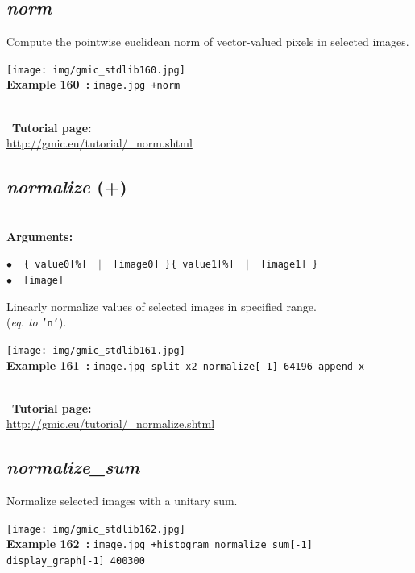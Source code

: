\documentclass[a4paper,10.5pt,twoside]{book}
\def\comma{\discretionary{,}{}{,}}
\newcommand{\Cb}[1]{\textcolor{cb}{#1}}
\begin{document}
\subsection{\emph{norm} }\vspace*{-0.7em}
Compute the pointwise euclidean norm of vector-valued pixels in selected images.
\begin{center}\texttt{[image: img/gmic\_stdlib160.jpg]}\\
{\footnotesize \textbf{Example 160~:} \texttt{image.jpg +norm}}
\end{center}
~\\
~\textbf{Tutorial page: }\\\url{http://gmic.eu/tutorial/\_norm.shtml}


\subsection{\emph{normalize} (+)}\vspace*{-0.7em}
~\\\textbf{\Cb{Arguments: }}\begin{flushleft}
{\small \Cb{\hspace*{0.5cm}$\bullet$~~\texttt{\{ value0[\%] ~$|$~ [image0] \}{\comma}\{ value1[\%] ~$|$~ [image1] \}}}}~~~\\
{\small \Cb{\hspace*{0.5cm}$\bullet$~~\texttt{[image]}}}\end{flushleft}
Linearly normalize values of selected images in specified range.
~\\(\emph{eq. to} {\small \texttt{'n'}}).
\begin{center}\texttt{[image: img/gmic\_stdlib161.jpg]}\\
{\footnotesize \textbf{Example 161~:} \texttt{image.jpg split x{\comma}2 normalize[-1] 64{\comma}196 append x}}
\end{center}
~\\
~\textbf{Tutorial page: }\\\url{http://gmic.eu/tutorial/\_normalize.shtml}


\subsection{\emph{normalize\_sum} }\vspace*{-0.7em}
Normalize selected images with a unitary sum.
\begin{center}\texttt{[image: img/gmic\_stdlib162.jpg]}\\
{\footnotesize \textbf{Example 162~:} \texttt{image.jpg +histogram normalize\_sum[-1] display\_graph[-1] 400{\comma}300}}
\end{center}
\end{document}
